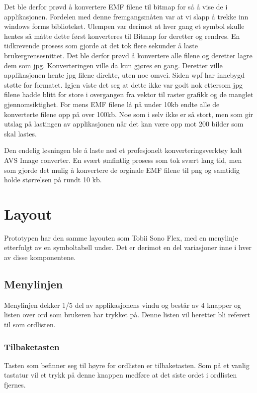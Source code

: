 Det ble derfor prøvd å konvertere EMF filene til bitmap for så å vise de i applikasjonen. Fordelen med denne fremgangsmåten var at vi slapp å trekke inn windows forms biblioteket. Ulempen var derimot at hver gang et symbol skulle hentes så måtte dette først konverteres til Bitmap for deretter og rendres. En tidkrevende prosess som gjorde at det tok flere sekunder å laste brukergrensesnittet. Det ble derfor prøvd å konvertere alle filene og deretter lagre dem som jpg. Konverteringen ville da kun gjøres en gang. Deretter ville applikasjonen hente jpg filene direkte, uten noe omvei. Siden wpf har innebygd støtte for formatet. Igjen viste det seg at dette ikke var godt nok ettersom jpg filene hadde blitt for store i overgangen fra vektor til raster grafikk og de manglet gjennomsiktighet. For mens EMF filene lå på under 10kb endte alle de konverterte filene opp på over 100kb. Noe som i selv ikke er så stort, men som gir utslag på lastingen av applikasjonen når det kan være opp mot 200 bilder som skal lastes.

Den endelig løsningen ble å laste ned et profesjonelt konverteringsverktøy kalt AVS Image converter. En svært ømfintlig prosess som tok svært lang tid, men som gjorde det mulig å konvertere de orginale EMF filene til png og samtidig holde størrelsen på rundt 10 kb.





\section{Layout}

Prototypen har den samme layouten som Tobii Sono Flex, med en menylinje etterfulgt av en symboltabell under. Det er derimot en del variasjoner inne i hver av disse komponentene.

\subsection{Menylinjen}

Menylinjen dekker 1/5 del av applikasjonens vindu og består av 4 knapper og listen over ord som brukeren har trykket på. Denne listen vil heretter bli referert til som ordlisten.

\subsubsection{Tilbaketasten}

Tasten som befinner seg til høyre for ordlisten er tilbaketasten. Som på et vanlig tastatur vil et trykk på denne knappen medføre at det siste ordet i ordlisten fjernes.

